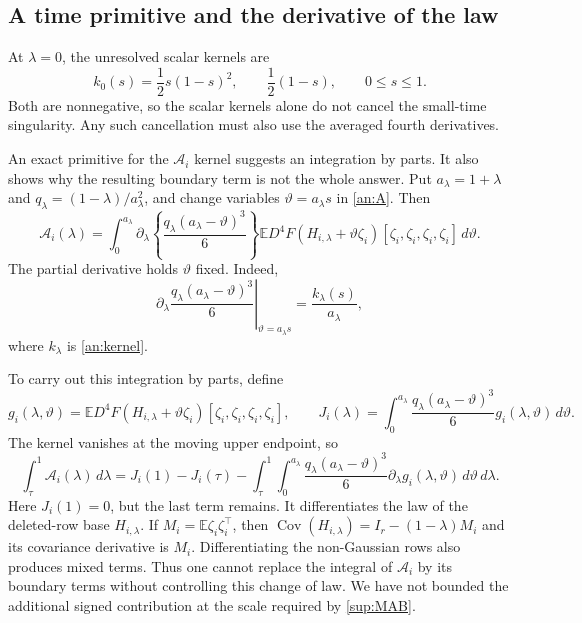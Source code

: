 \documentclass[11pt,a4paper]{article}
\theoremstyle{remark}
\newcommand{\E}{\mathbb E}
\newcommand{\Cov}{\operatorname{Cov}}
\newcommand{\dd}{\,d}
\begin{document}
\subsection{A time primitive and the derivative of the law}
\label{sup:primitive}

At \(\lambda=0\), the unresolved scalar kernels are
\[
 k_0(s)=\frac12s(1-s)^2,
 \qquad \frac12(1-s),\qquad 0\le s\le1.
\]
Both are nonnegative, so the scalar kernels alone do not cancel the
small-time singularity. Any such cancellation must also use the
averaged fourth derivatives.

An exact primitive for the \(\mathcal A_i\) kernel suggests an integration
by parts. It also shows why the resulting boundary term is not the
whole answer.
Put \(a_\lambda=1+\lambda\) and
\(q_\lambda=(1-\lambda)/a_\lambda^2\), and change variables
\(\vartheta=a_\lambda s\) in \eqref{an:A}. Then
\begin{equation}
 \mathcal A_i(\lambda)=\int_0^{a_\lambda}
  \partial_\lambda\left\{
    \frac{q_\lambda(a_\lambda-\vartheta)^3}{6}\right\}
  \E D^4F(H_{i,\lambda}+\vartheta\zeta_i)
       [\zeta_i,\zeta_i,\zeta_i,\zeta_i]\dd\vartheta.
 \label{sup:primitive-identity}
\end{equation}
The partial derivative holds \(\vartheta\) fixed. Indeed,
\[
 \left.\partial_\lambda
   \frac{q_\lambda(a_\lambda-\vartheta)^3}{6}
 \right|_{\vartheta=a_\lambda s}
 =\frac{k_\lambda(s)}{a_\lambda},
\]
where \(k_\lambda\) is \eqref{an:kernel}.

To carry out this integration by parts, define
\[
 g_i(\lambda,\vartheta)
 =\E D^4F(H_{i,\lambda}+\vartheta\zeta_i)
        [\zeta_i,\zeta_i,\zeta_i,\zeta_i],
 \qquad
 J_i(\lambda)=\int_0^{a_\lambda}
     \frac{q_\lambda(a_\lambda-\vartheta)^3}{6}
     g_i(\lambda,\vartheta)\dd\vartheta.
\]
The kernel vanishes at the moving upper endpoint, so
\begin{equation}
 \int_\tau^1\mathcal A_i(\lambda)\dd\lambda
 =J_i(1)-J_i(\tau)
 -\int_\tau^1\int_0^{a_\lambda}
   \frac{q_\lambda(a_\lambda-\vartheta)^3}{6}
   \partial_\lambda g_i(\lambda,\vartheta)
   \dd\vartheta\dd\lambda.
 \label{sup:primitive-correction}
\end{equation}
Here \(J_i(1)=0\), but the last term remains. It differentiates the law
of the deleted-row base \(H_{i,\lambda}\). If
\(M_i=\E\zeta_i\zeta_i^\top\), then
\(\Cov(H_{i,\lambda})=I_r-(1-\lambda)M_i\) and its covariance
derivative is \(M_i\). Differentiating the non-Gaussian rows also
produces mixed terms. Thus one cannot replace the integral of
\(\mathcal A_i\) by its boundary terms without controlling this change
of law. We have not bounded the additional signed contribution at the
scale required by \eqref{sup:MAB}.
\end{document}
